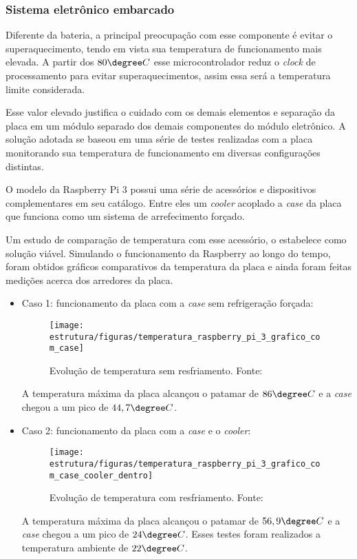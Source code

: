 \subsubsection*{Sistema eletrônico embarcado}

 Diferente da bateria, a principal preocupação com esse componente é evitar o superaquecimento, tendo em vista sua temperatura de funcionamento mais elevada. A partir dos $80 \degree C$ esse microcontrolador reduz o \textit{clock} de processamento para evitar superaquecimentos, assim essa será a temperatura limite considerada.
 
 Esse valor elevado justifica o cuidado com os demais elementos e separação da placa em um módulo separado dos demais componentes do módulo eletrônico. A solução adotada se baseou em uma série de testes realizadas com a placa monitorando sua temperatura de funcionamento em diversas configurações distintas.
 
 O modelo da Raspberry Pi 3 possui uma série de acessórios e dispositivos complementares em seu catálogo. Entre eles um \textit{cooler} acoplado a \textit{case} da placa que funciona como um sistema de arrefecimento forçado.
 
 Um estudo de comparação de temperatura com esse acessório, o estabelece como solução viável. Simulando o funcionamento da Raspberry ao longo do tempo, foram obtidos gráficos comparativos da temperatura da placa e ainda foram feitas medições acerca dos arredores da placa.

 \begin{itemize}
 \item Caso 1: funcionamento da placa  com a \textit{case} sem refrigeração forçada:
 \begin{figure}[H]
	\centering
\texttt{[image: estrutura/figuras/temperatura\_raspberry\_pi\_3\_grafico\_com\_case]}
	\caption{Evolução de temperatura sem resfriamento. Fonte: \cite{resf_rasp}}
	\label{fig1} 
	\end{figure}

 A temperatura máxima da placa alcançou o patamar de $86 \degree C$ e a \textit{case} chegou a um pico de $44,7 \degree C$.
 
 \item Caso 2: funcionamento da placa com a \textit{case} e o \textit{cooler}: 
 \begin{figure}[H]
	\centering
\texttt{[image: estrutura/figuras/temperatura\_raspberry\_pi\_3\_grafico\_com\_case\_cooler\_dentro]}
\caption{Evolução de temperatura com resfriamento. Fonte: \cite{resf_rasp}}
	\label{fig2} 
	\end{figure}

 A temperatura máxima da placa alcançou o patamar de $56,9 \degree C$ e a \textit{case} chegou a um pico de $24 \degree C$. Esses testes foram realizados a temperatura ambiente de $22 \degree C$.
  
 \end{itemize}


